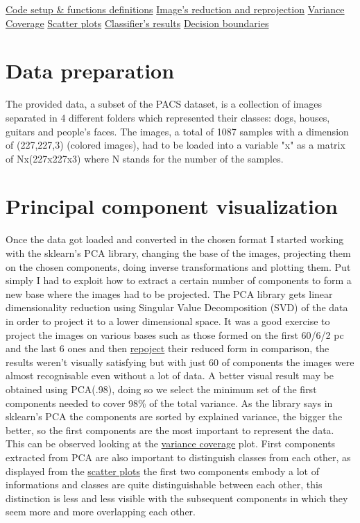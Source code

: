 \documentclass[11pt]{article}
\begin{document}
\hyperlink{definitions}{Code setup \& functions definitions}\newline
\hyperlink{reprojection}{Image's reduction and reprojection}\newline
\hyperlink{varianceCoverage}{Variance Coverage}\newline
\hyperlink{scatter}{Scatter plots}\newline
\hyperlink{classifier}{Classifier's results}\newline
\hyperlink{boundaries}{Decision boundaries}

\section{Data preparation}\label{data-preparation}

The provided data, a subset of the PACS dataset, is a collection of
images separated in 4 different folders which represented their classes:
dogs, houses, guitars and people's faces. The images, a total of 1087
samples with a dimension of (227,227,3) (colored images), had to be
loaded into a variable "x" as a matrix of Nx(227x227x3) where N stands
for the number of the samples.

\section{Principal component
visualization}\label{principal-component-visualization}

Once the data got loaded and converted in the chosen format I started
working with the sklearn's PCA library, changing the base of the images,
projecting them on the chosen components, doing inverse transformations
and plotting them. Put simply I had to exploit how to extract a certain
number of components to form a new base where the images had to be
projected. The PCA library gets linear dimensionality reduction using
Singular Value Decomposition (SVD) of the data in order to project it to
a lower dimensional space. It was a good exercise to project the images
on various bases such as those formed on the first 60/6/2 pc and the
last 6 ones and then \hyperlink{reprojection}{repoject} their reduced form in
comparison, the results weren't visually satisfying but with just 60 of
components the images were almost recognisable even without a lot of
data. A better visual result may be obtained using PCA(.98), doing so we
select the minimum set of the first components needed to cover 98\% of
the total variance. As the library says in sklearn's PCA the components
are sorted by explained variance, the bigger the better, so the first
components are the most important to represent the data. This can be
observed looking at the \hyperlink{varianceCoverage}{variance coverage} plot. First
components extracted from PCA are also important to distinguish classes
from each other, as displayed from the \hyperlink{scatter}{scatter plots} the first
two components embody a lot of informations and classes are quite
distinguishable between each other, this distinction is less and less
visible with the subsequent components in which they seem more and more
overlapping each other.
\end{document}
